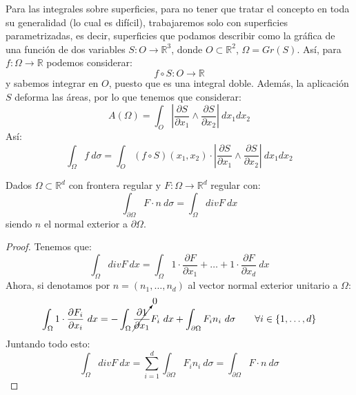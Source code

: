 \noindent
Para las integrales sobre superficies, para no tener que tratar el concepto en toda su generalidad (lo cual es difícil), trabajaremos solo con superficies parametrizadas, es decir, superficies que podamos describir como la gráfica de una función de dos variables $S:O\to \mathbb{R}^3$, donde $O\subset \mathbb{R}^2$, $\Omega = Gr(S)$. Así, para $f:\Omega\to\mathbb{R}$ podemos considerar:
\begin{equation*}
    f\circ S:O\to \mathbb{R}
\end{equation*}
y sabemos integrar en $O$, puesto que es una integral doble. Además, la aplicación $S$ deforma las áreas, por lo que tenemos que considerar:
\begin{equation*}
    A(\Omega) = \int_O \left|\frac{\partial S}{\partial x_1}\land \frac{\partial S}{\partial x_2}\right|~dx_1dx_2
\end{equation*}
Así:
\begin{equation*}
    \int_\Omega f~d\sigma = \int_O (f\circ S)(x_1,x_2) \cdot \left|\frac{\partial S}{\partial x_1}\land \frac{\partial S}{\partial x_2}\right|~dx_1dx_2
\end{equation*}

\begin{teo}[de la divergencia]
    Dados $\Omega\subset\mathbb{R}^d$ con frontera regular y $F:\Omega\to\mathbb{R}^d$ regular con:
    \begin{equation*}
        \int_{\partial \Omega}F\cdot n~d\sigma = \int_\Omega div F~dx
    \end{equation*}
    siendo $n$ el normal exterior a $\partial \Omega$.
    \begin{proof}
        Tenemos que:
        \begin{equation*}
            \int_\Omega div F~dx = \int_\Omega 1\cdot \frac{\partial F}{\partial x_1} + \ldots + 1\cdot \frac{\partial F}{\partial x_d}~dx
        \end{equation*}
        Ahora, si denotamos por $n = (n_1,\ldots,n_d)$ al vector normal exterior unitario a $\Omega$:
        \begin{equation*}
            \int_\Omega 1\cdot \frac{\partial F_i}{\partial x_i}~dx =-\int_\Omega \cancelto{0}{\frac{\partial 1}{\partial x_1}}F_i~dx + \int_{\partial \Omega}F_in_i~d\sigma \qquad \forall i \in \{1,\ldots,d\}
        \end{equation*}
        Juntando todo esto:
        \begin{equation*}
            \int_\Omega div F~dx = \sum_{i=1}^{d}\int_{\partial \Omega}F_in_i~d\sigma = \int_{\partial \Omega}F\cdot n~d\sigma
        \end{equation*}
    \end{proof}
\end{teo}


